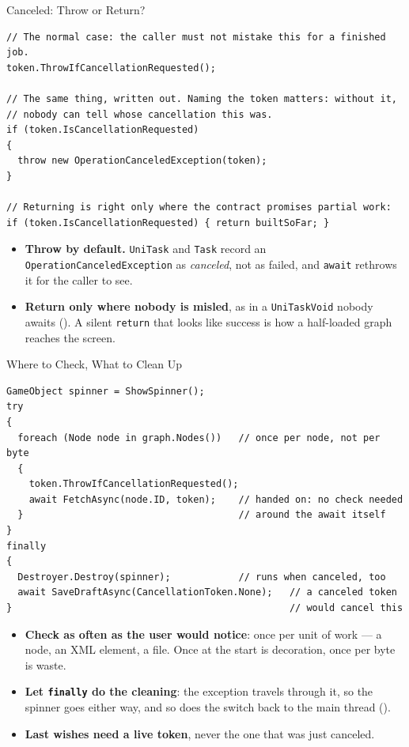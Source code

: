 \begin{frame}[fragile]{Canceled: Throw or Return?}
  \begin{lstlisting}[basicstyle=\scriptsize\ttfamily]
// The normal case: the caller must not mistake this for a finished job.
token.ThrowIfCancellationRequested();

// The same thing, written out. Naming the token matters: without it,
// nobody can tell whose cancellation this was.
if (token.IsCancellationRequested)
{
  throw new OperationCanceledException(token);
}

// Returning is right only where the contract promises partial work:
if (token.IsCancellationRequested) { return builtSoFar; }
  \end{lstlisting}
  \vspace{0.5ex}

  \begin{itemize}
    \item \textbf{Throw by default.} \texttt{UniTask} and \texttt{Task} record
      an \texttt{OperationCanceledException} as \emph{canceled}, not as
      failed, and \texttt{await} rethrows it for the caller to see.
    \item \textbf{Return only where nobody is misled}, as in a
      \texttt{UniTaskVoid} nobody awaits (). A silent
      \texttt{return} that looks like success is how a half-loaded graph
      reaches the screen.
  \end{itemize}
\end{frame}

\begin{frame}[fragile]{Where to Check, What to Clean Up}
  \begin{lstlisting}[basicstyle=\scriptsize\ttfamily]
GameObject spinner = ShowSpinner();
try
{
  foreach (Node node in graph.Nodes())   // once per node, not per byte
  {
    token.ThrowIfCancellationRequested();
    await FetchAsync(node.ID, token);    // handed on: no check needed
  }                                      // around the await itself
}
finally
{
  Destroyer.Destroy(spinner);            // runs when canceled, too
  await SaveDraftAsync(CancellationToken.None);   // a canceled token
}                                                 // would cancel this
  \end{lstlisting}

  \begin{itemize}
    \item \textbf{Check as often as the user would notice}: once per unit of
      work --- a node, an XML element, a file. Once at the start is decoration,
      once per byte is waste.
    \item \textbf{Let \texttt{finally} do the cleaning}: the exception travels
      through it, so the spinner goes either way, and so does the switch back
      to the main thread ().
    \item \textbf{Last wishes need a live token}, never the one that was just
      canceled.
  \end{itemize}
\end{frame}

